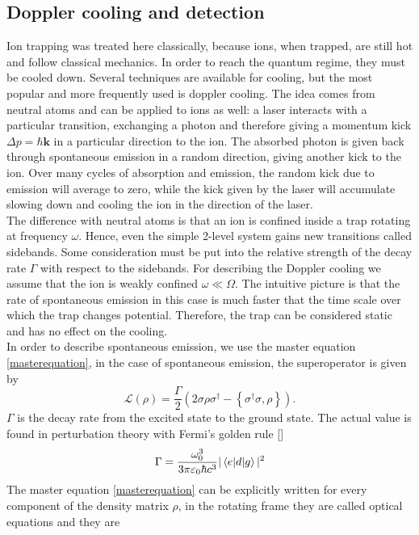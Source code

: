 \subsection{Doppler cooling and detection}
Ion trapping was treated here classically, because ions, when trapped, are still hot and follow classical mechanics. In order to reach the quantum regime, they must be cooled down. Several techniques are available for cooling, but the most popular and more frequently used is doppler cooling. The idea comes from neutral atoms and can be applied to ions as well: a laser interacts with a particular transition, exchanging a photon and therefore giving a momentum kick $\Delta p = \hbar \mathbf{k}$ in a particular direction to the ion. The absorbed photon is given back through spontaneous emission in a random direction, giving another kick to the ion. Over many cycles of absorption and emission, the random kick due to emission will average to zero, while the kick given by the laser will accumulate slowing down and cooling the ion in the direction of the laser. \\
The difference with neutral atoms is that an ion is confined inside a trap rotating at frequency $\omega$. Hence, even the simple 2-level system gains new transitions called sidebands. Some consideration must be put into the relative strength of the decay rate $\Gamma$ with respect to the sidebands. For describing the Doppler cooling we assume that the ion is weakly confined $\omega \ll \Omega$. The intuitive picture is that the rate of spontaneous emission in this case is much faster that the time scale over which the trap changes potential. Therefore, the trap can be considered static  and has no effect on the cooling.\\
In order to describe spontaneous emission, we use the master equation \eqref{masterequation}, in the case of spontaneous emission, the superoperator is given by \cite{gabriel}
\begin{equation}
\mathcal{L}(\rho) = \frac{\Gamma}{2}\left(2\sigma \rho \sigma^\dagger - \left\{\sigma^\dagger \sigma, \rho\right\}\right).
\end{equation}
$\Gamma$ is the decay rate from the excited state to the ground state. The actual value is found in perturbation theory with Fermi's golden rule []
\begin{equation}
\Gamma = \frac{\omega_0^3}{3\pi \varepsilon_0 \hbar c^3} |\braket{e|d|g}|^2
\end{equation}
The master equation \eqref{masterequation} can be explicitly written for every component of the density matrix $\rho$, in the rotating frame they are called optical equations and they are

